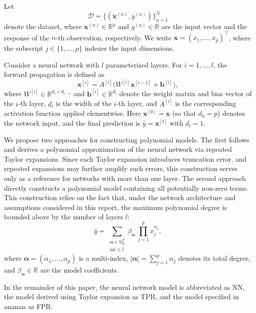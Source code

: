 \documentclass[]{interact}
\theoremstyle{plain}
\theoremstyle{definition}
\theoremstyle{remark}
\begin{document}
Let
\[
\mathcal{D}=\bigl\{(\mathbf{x}^{(n)},y^{(n)})\bigr\}_{n=1}^{N}
\]
denote the dataset, where $\mathbf{x}^{(n)}\in\mathbb{R}^{p}$ and
$y^{(n)}\in\mathbb{R}$ are the input vector and the response of the $n$-th
observation, respectively. We write $\mathbf{x}=(x_1,\dots,x_p)^{\top}$,
where the subscript $j\in\{1,\dots,p\}$ indexes the input dimensions.

Consider a neural network with $l$ parameterized layers. For
$i=1,\dots,l$, the forward propagation is defined as
\begin{equation}
\mathbf{x}^{[i]} = A^{[i]}\!\bigl(W^{[i]}\mathbf{x}^{[i-1]}
                  + \mathbf{b}^{[i]}\bigr),
\label{eq:forward}
\end{equation}
where $W^{[i]}\in\mathbb{R}^{d_i\times d_{i-1}}$ and
$\mathbf{b}^{[i]}\in\mathbb{R}^{d_i}$ denote the weight matrix and bias
vector of the $i$-th layer, $d_i$ is the width of the $i$-th layer, and
$A^{[i]}$ is the corresponding activation function applied elementwise.
Here $\mathbf{x}^{[0]}=\mathbf{x}$ (so that $d_0=p$) denotes the network
input, and the final prediction is $\hat{y}=\mathbf{x}^{[l]}$ with
$d_l=1$.

We propose two approaches for constructing polynomial models. The first
follows \cite{morala2021towards} and derives a polynomial approximation of
the neural network via repeated Taylor expansions. Since each Taylor
expansion introduces truncation error, and repeated expansions may further
amplify such errors, this construction serves only as a reference for
networks with more than one layer. The second approach directly constructs
a polynomial model containing all potentially non-zero terms. This
construction relies on the fact that, under the network architecture and
assumptions considered in this report, the maximum polynomial degree is
bounded above by the number of layers $l$:
\begin{equation}
\hat{y}
=\sum_{\substack{\boldsymbol{\alpha}\in\mathbb{N}_0^{p}\\
                 |\boldsymbol{\alpha}|\le l}}
 \beta_{\boldsymbol{\alpha}}\,
 \prod_{j=1}^{p} x_j^{\alpha_j},
\label{eq:fullpoly}
\end{equation}
where $\boldsymbol{\alpha}=(\alpha_1,\dots,\alpha_p)$ is a multi-index,
$|\boldsymbol{\alpha}|=\sum_{j=1}^{p}\alpha_j$ denotes its total degree,
and $\beta_{\boldsymbol{\alpha}}\in\mathbb{R}$ are the model coefficients.

In the remainder of this paper, the neural network model is abbreviated as NN, the model derived using Taylor expansion as TPR, and the model specified in ananan as FPR.
\end{document}
